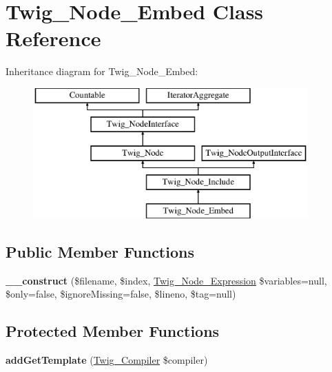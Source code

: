 \hypertarget{classTwig__Node__Embed}{}\section{Twig\+\_\+\+Node\+\_\+\+Embed Class Reference}
\label{classTwig__Node__Embed}
Inheritance diagram for Twig\+\_\+\+Node\+\_\+\+Embed\+:\begin{figure}[H]
\begin{center}
\leavevmode
\includegraphics[height=5.000000cm]{classTwig__Node__Embed}
\end{center}
\end{figure}
\subsection*{Public Member Functions}
\begin{DoxyCompactItemize}
\item 
{\bfseries \+\_\+\+\_\+construct} (\$filename, \$index, \hyperlink{classTwig__Node__Expression}{Twig\+\_\+\+Node\+\_\+\+Expression} \$variables=null, \$only=false, \$ignore\+Missing=false, \$lineno, \$tag=null)\hypertarget{classTwig__Node__Embed_a0ca614f542d43bf770309b6693ab58cb}{}\label{classTwig__Node__Embed_a0ca614f542d43bf770309b6693ab58cb}

\end{DoxyCompactItemize}
\subsection*{Protected Member Functions}
\begin{DoxyCompactItemize}
\item 
{\bfseries add\+Get\+Template} (\hyperlink{classTwig__Compiler}{Twig\+\_\+\+Compiler} \$compiler)\hypertarget{classTwig__Node__Embed_abb41b923197f0db9ad7c0093713ee579}{}\label{classTwig__Node__Embed_abb41b923197f0db9ad7c0093713ee579}

\end{DoxyCompactItemize}
